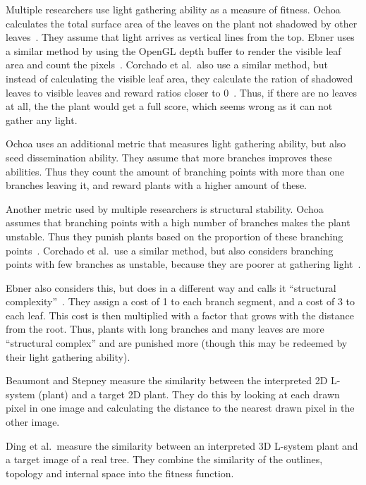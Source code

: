 Multiple researchers use light gathering ability as a measure of fitness.
Ochoa calculates the total surface area of the leaves on the plant not shadowed by other leaves~\cite{1998Ochoa}.
They assume that light arrives as vertical lines from the top.
Ebner uses a similar method by using the OpenGL depth buffer to render the visible leaf area and count the pixels~\cite{2003Ebner}.
Corchado et al.\ also use a similar method, but instead of calculating the visible leaf area, they calculate the ration of shadowed leaves to visible leaves and reward ratios closer to 0~\cite{2009Corchado}.
Thus, if there are no leaves at all, the the plant would get a full score, which seems wrong as it can not gather any light.

Ochoa uses an additional metric that measures light gathering ability, but also seed dissemination ability.
They assume that more branches improves these abilities.
Thus they count the amount of branching points with more than one branches leaving it, and reward plants with a higher amount of these.~\cite{1998Ochoa}

Another metric used by multiple researchers is structural stability.
Ochoa assumes that branching points with a high number of branches makes the plant unstable.
Thus they punish plants based on the proportion of these branching points~\cite{1998Ochoa}.
Corchado et al.\ use a similar method, but also considers branching points with few branches as unstable, because they are poorer at gathering light~\cite{2009Corchado}.

Ebner also considers this, but does in a different way and calls it ``structural complexity''~\cite{2003Ebner}.
They assign a cost of 1 to each branch segment, and a cost of 3 to each leaf.
This cost is then multiplied with a factor that grows with the distance from the root.
Thus, plants with long branches and many leaves are more ``structural complex'' and are punished more (though this may be redeemed by their light gathering ability).

Beaumont and Stepney measure the similarity between the interpreted 2D L-system (plant) and a target 2D plant.
They do this by looking at each drawn pixel in one image and calculating the distance to the nearest drawn pixel in the other image.~\cite{2009Beaumont}

Ding et al.\ measure the similarity between an interpreted 3D L-system plant and a target image of a real tree.
They combine the similarity of the outlines, topology and internal space into the fitness function.~\cite{2013Ding}

